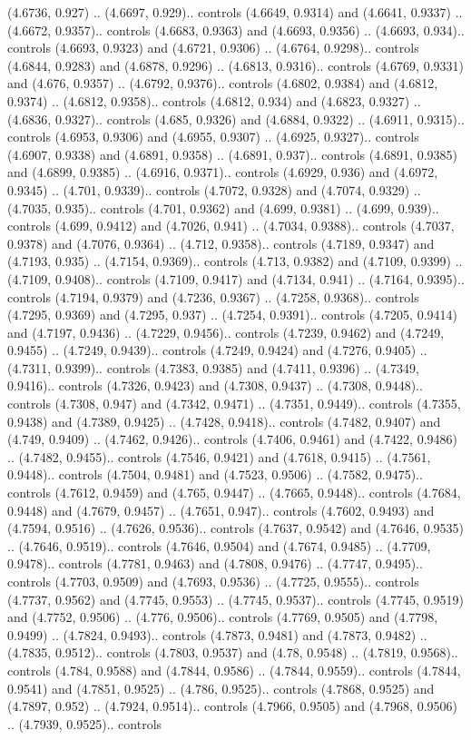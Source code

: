 (4.6736, 0.927) .. (4.6697, 0.929).. controls (4.6649, 0.9314) and (4.6641, 0.9337) .. (4.6672, 0.9357).. controls (4.6683, 0.9363) and (4.6693, 0.9356) .. (4.6693, 0.934).. controls (4.6693, 0.9323) and (4.6721, 0.9306) .. (4.6764, 0.9298).. controls (4.6844, 0.9283) and (4.6878, 0.9296) .. (4.6813, 0.9316).. controls (4.6769, 0.9331) and (4.676, 0.9357) .. (4.6792, 0.9376).. controls (4.6802, 0.9384) and (4.6812, 0.9374) .. (4.6812, 0.9358).. controls (4.6812, 0.934) and (4.6823, 0.9327) .. (4.6836, 0.9327).. controls (4.685, 0.9326) and (4.6884, 0.9322) .. (4.6911, 0.9315).. controls (4.6953, 0.9306) and (4.6955, 0.9307) .. (4.6925, 0.9327).. controls (4.6907, 0.9338) and (4.6891, 0.9358) .. (4.6891, 0.937).. controls (4.6891, 0.9385) and (4.6899, 0.9385) .. (4.6916, 0.9371).. controls (4.6929, 0.936) and (4.6972, 0.9345) .. (4.701, 0.9339).. controls (4.7072, 0.9328) and (4.7074, 0.9329) .. (4.7035, 0.935).. controls (4.701, 0.9362) and (4.699, 0.9381) .. (4.699, 0.939).. controls (4.699, 0.9412) and (4.7026, 0.941) .. (4.7034, 0.9388).. controls (4.7037, 0.9378) and (4.7076, 0.9364) .. (4.712, 0.9358).. controls (4.7189, 0.9347) and (4.7193, 0.935) .. (4.7154, 0.9369).. controls (4.713, 0.9382) and (4.7109, 0.9399) .. (4.7109, 0.9408).. controls (4.7109, 0.9417) and (4.7134, 0.941) .. (4.7164, 0.9395).. controls (4.7194, 0.9379) and (4.7236, 0.9367) .. (4.7258, 0.9368).. controls (4.7295, 0.9369) and (4.7295, 0.937) .. (4.7254, 0.9391).. controls (4.7205, 0.9414) and (4.7197, 0.9436) .. (4.7229, 0.9456).. controls (4.7239, 0.9462) and (4.7249, 0.9455) .. (4.7249, 0.9439).. controls (4.7249, 0.9424) and (4.7276, 0.9405) .. (4.7311, 0.9399).. controls (4.7383, 0.9385) and (4.7411, 0.9396) .. (4.7349, 0.9416).. controls (4.7326, 0.9423) and (4.7308, 0.9437) .. (4.7308, 0.9448).. controls (4.7308, 0.947) and (4.7342, 0.9471) .. (4.7351, 0.9449).. controls (4.7355, 0.9438) and (4.7389, 0.9425) .. (4.7428, 0.9418).. controls (4.7482, 0.9407) and (4.749, 0.9409) .. (4.7462, 0.9426).. controls (4.7406, 0.9461) and (4.7422, 0.9486) .. (4.7482, 0.9455).. controls (4.7546, 0.9421) and (4.7618, 0.9415) .. (4.7561, 0.9448).. controls (4.7504, 0.9481) and (4.7523, 0.9506) .. (4.7582, 0.9475).. controls (4.7612, 0.9459) and (4.765, 0.9447) .. (4.7665, 0.9448).. controls (4.7684, 0.9448) and (4.7679, 0.9457) .. (4.7651, 0.947).. controls (4.7602, 0.9493) and (4.7594, 0.9516) .. (4.7626, 0.9536).. controls (4.7637, 0.9542) and (4.7646, 0.9535) .. (4.7646, 0.9519).. controls (4.7646, 0.9504) and (4.7674, 0.9485) .. (4.7709, 0.9478).. controls (4.7781, 0.9463) and (4.7808, 0.9476) .. (4.7747, 0.9495).. controls (4.7703, 0.9509) and (4.7693, 0.9536) .. (4.7725, 0.9555).. controls (4.7737, 0.9562) and (4.7745, 0.9553) .. (4.7745, 0.9537).. controls (4.7745, 0.9519) and (4.7752, 0.9506) .. (4.776, 0.9506).. controls (4.7769, 0.9505) and (4.7798, 0.9499) .. (4.7824, 0.9493).. controls (4.7873, 0.9481) and (4.7873, 0.9482) .. (4.7835, 0.9512).. controls (4.7803, 0.9537) and (4.78, 0.9548) .. (4.7819, 0.9568).. controls (4.784, 0.9588) and (4.7844, 0.9586) .. (4.7844, 0.9559).. controls (4.7844, 0.9541) and (4.7851, 0.9525) .. (4.786, 0.9525).. controls (4.7868, 0.9525) and (4.7897, 0.952) .. (4.7924, 0.9514).. controls (4.7966, 0.9505) and (4.7968, 0.9506) .. (4.7939, 0.9525).. controls 